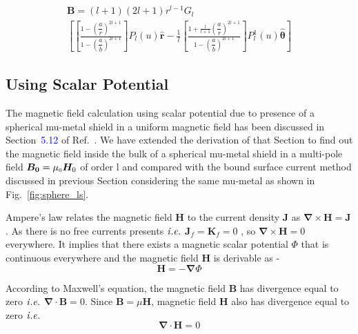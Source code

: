\begin{multline}\label{B2}
    \bm B= (l+1)(2l+1)r^{l-1}G_l\\\left[\left[\frac{1-\left(\dfrac{a}{r}\right)^{2l+1}}{1-\left(\dfrac{a}{b}\right)^{2l+1}}\right] P_l(u) \bm{\hat{r}} -\frac{1}{l}\left[\frac{1+\frac{l}{l+1}\left(\dfrac{a}{r}\right)^{2l+1}}{1-\left(\dfrac{a}{b}\right)^{2l+1}}\right] P_l^1(u) \bm{\hat{\theta}}\right]
\end{multline}



\subsection{Using Scalar Potential}
The magnetic field calculation using scalar potential due to presence of a spherical mu-metal shield in a uniform magnetic field has been discussed in Section~\textcolor{blue}{5.12} of Ref.~\cite{jackson}. We have extended the derivation of that Section to find out the magnetic field inside the bulk of a spherical mu-metal shield in a multi-pole field \(\bm{B_0}= \mu_{\scriptscriptstyle 0} \bm H_0\) of order l and compared with the bound surface current method discussed in previous Section considering the same mu-metal as shown in Fig.~\ref{fig:sphere_ls}.


Ampere's law relates the magnetic field $\bm{H}$ to the current density $\bm{J}$ as \(\bm{\nabla}\times\bm{H}=\bm{J}\). As there is no free currents presents $\it{i.e.}$ \(\bm{J}_f=\bm{K}_f=0\) , so \(\bm{\nabla}\times\bm{H}=0\) everywhere. It implies that there exists a magnetic scalar potential \(\Phi\) that is continuous  everywhere and the  magnetic field $\bm{H}$ is derivable as -
\begin{equation}\label{H}
\bm{H}=-\bm{\nabla}\Phi
\end{equation} 

According to Maxwell's equation, the magnetic field $\bm{B}$ has divergence equal to zero $\it{i.e.}$ \(\bm{\nabla}\cdot\bm{B}=0\). Since \(\bm{B}=\mu\bm{H}\), magnetic field $\bm{H}$ also has divergence equal to zero $\it{i.e.}$
\begin{equation}\label{nablaH}
\bm{\nabla}\cdot\bm{H}=0
\end{equation}

